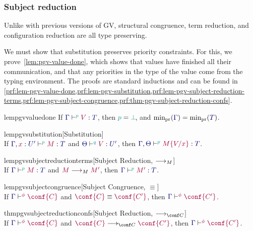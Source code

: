 \documentclass[main.tex]{subfiles}
\begin{document}
\subsubsection*{Subject reduction}
Unlike with previous versions of GV, structural congruence, term reduction, and configuration reduction are all type preserving.

We must show that substitution preserves priority constraints. For this, we prove~\cref{lem:pgv-value-done}, which shows that values have finished all their communication, and that any priorities in the type of the value come from the typing environment. The proofs are standard inductions and can be found in \cref{prf:lem-pgv-value-done,prf:lem-pgv-substitution,prf:lem-pgv-subject-reduction-terms,prf:lem-pgv-subject-congruence,prf:thm-pgv-subject-reduction-confs}.
\begin{compacttheorems}
  \begin{restatablelemma}{lempgvvaluedone}
    \label{lem:pgv-value-done}
    If $\tseq[\cs{p}]{\ty{\Gamma}}{V}{T}$, then $\cs{p}=\cs{\pbot}$, and $\minpr(\ty{\Gamma})=\minpr(\ty{T})$.
  \end{restatablelemma}
  \begin{restatablelemma}{lempgvsubstitution}[Substitution]
    \label{lem:pgv-substitution}
    \hfill\\%
    If $\tseq[\cs{p}]{\ty{\Gamma},\tmty{x}{U'}}{M}{T}$ and $\tseq[\cs{q}]{\ty{\Theta}}{V}{U'}$, then $\tseq[\cs{p}]{\ty{\Gamma},\ty{\Theta}}{\subst{M}{V}{x}}{T}$.
  \end{restatablelemma}
  \begin{restatablelemma}{lempgvsubjectreductionterms}[Subject Reduction, $\longrightarrow_{M}$]
    \label{lem:pgv-subject-reduction-terms}
    \hfill\\%
    If $\tseq[\cs{p}]{\ty{\Gamma}}{M}{T}$ and $\tm{M}\tred\tm{M'}$,
    then $\tseq[\cs{p}]{\ty{\Gamma}}{M'}{T}$.
  \end{restatablelemma}
  \begin{restatablelemma}{lempgvsubjectcongruence}[Subject Congruence, $\equiv$]
    \label{lem:pgv-subject-congruence}
    \hfill\\%
    If $\cseq[\phi]{\ty{\Gamma}}{\conf{C}}$ and $\tm{\conf{C}}\equiv\tm{\conf{C'}}$,
    then $\cseq[\phi]{\ty{\Gamma}}{\conf{C'}}$.
  \end{restatablelemma}
  \begin{restatabletheorem}{thmpgvsubjectreductionconfs}[Subject Reduction, $\cred$]
    \label{thm:pgv-subject-reduction-confs}
    \hfill\\%
    If $\cseq[\phi]{\ty{\Gamma}}{\conf{C}}$ and $\tm{\conf{C}}\cred\tm{\conf{C'}}$,
    then $\cseq[\phi]{\ty{\Gamma}}{\conf{C'}}$.
  \end{restatabletheorem}
\end{compacttheorems}
\end{document}
